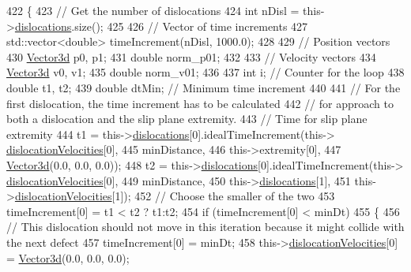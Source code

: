 \begin{DoxyCode}
422  \{
423    \textcolor{comment}{// Get the number of dislocations}
424    \textcolor{keywordtype}{int} nDisl = this->\hyperlink{classSlipPlane_ad92c7c409f7e161db449528389180910}{dislocations}.size();
425 
426    \textcolor{comment}{// Vector of time increments}
427    std::vector<double> timeIncrement(nDisl, 1000.0);
428 
429    \textcolor{comment}{// Position vectors}
430    \hyperlink{classVector3d}{Vector3d} p0, p1;
431    \textcolor{keywordtype}{double} norm\_p01;
432 
433    \textcolor{comment}{// Velocity vectors}
434    \hyperlink{classVector3d}{Vector3d} v0, v1;
435    \textcolor{keywordtype}{double} norm\_v01;
436 
437    \textcolor{keywordtype}{int} i;         \textcolor{comment}{// Counter for the loop}
438    \textcolor{keywordtype}{double} t1, t2;
439    \textcolor{keywordtype}{double} dtMin;  \textcolor{comment}{// Minimum time increment}
440 
441    \textcolor{comment}{// For the first dislocation, the time increment has to be calculated}
442    \textcolor{comment}{// for approach to both a dislocation and the slip plane extremity.}
443    \textcolor{comment}{// Time for slip plane extremity}
444    t1 = this->\hyperlink{classSlipPlane_ad92c7c409f7e161db449528389180910}{dislocations}[0].idealTimeIncrement(this->
      \hyperlink{classSlipPlane_a107a3883169bf918664cb4e4fd4bd72c}{dislocationVelocities}[0],
445                                                  minDistance,
446                                                  this->extremity[0],
447                                                  \hyperlink{classVector3d}{Vector3d}(0.0, 0.0, 0.0));
448    t2 = this->\hyperlink{classSlipPlane_ad92c7c409f7e161db449528389180910}{dislocations}[0].idealTimeIncrement(this->
      \hyperlink{classSlipPlane_a107a3883169bf918664cb4e4fd4bd72c}{dislocationVelocities}[0],
449                                                  minDistance,
450                                                  this->\hyperlink{classSlipPlane_ad92c7c409f7e161db449528389180910}{dislocations}[1],
451                                                  this->\hyperlink{classSlipPlane_a107a3883169bf918664cb4e4fd4bd72c}{dislocationVelocities}[1]);
452    \textcolor{comment}{// Choose the smaller of the two}
453    timeIncrement[0] = t1 < t2 ? t1:t2;
454    \textcolor{keywordflow}{if} (timeIncrement[0] < minDt)
455      \{
456        \textcolor{comment}{// This dislocation should not move in this iteration because it might collide with the next defect}
457        timeIncrement[0] = minDt;
458        this->\hyperlink{classSlipPlane_a107a3883169bf918664cb4e4fd4bd72c}{dislocationVelocities}[0] = \hyperlink{classVector3d}{Vector3d}(0.0, 0.0, 0.0);

\end{DoxyCode}
